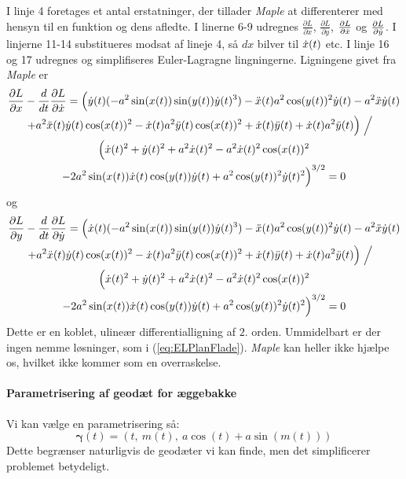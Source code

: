 I linje 4 foretages et antal erstatninger,
der tillader \emph{Maple} at differenterer med hensyn til en funktion og dens afledte.
I linerne 6-9 udregnes \(\frac{\partial L}{\partial x}\), \(\frac{\partial L}{\partial y}\),
 \(\frac{\partial L}{\partial \dot{x}}\) og \(\frac{\partial L}{\partial \dot{y}}\).
I linjerne 11-14 substitueres modsat af lineje 4, så \(dx\) bilver til \(\dot{x}(t)\) etc.
I linje 16 og 17 udregnes og simplifiseres Euler-Lagragne lingningerne.
Ligningene givet fra \emph{Maple} er
\begin{multline*}
\frac{\partial L}{\partial x} - \frac{d}{d t} \frac{\partial L}{\partial \dot{x}} = 
\Big(
\dot{y}(t)(-a^2\sin(x(t))\sin(y(t))\dot{y}(t)^3)
- \ddot{x}(t) a^2 \cos(y(t))^2 \dot{y}(t) - a^2\ddot{x}\dot{y}(t)\\
+ a^2\ddot{x}(t)\dot{y}(t)\cos(x(t))^2 - \dot{x}(t)a^2\ddot{y}(t)\cos(x(t))^2
+ \dot{x}(t) \ddot{y}(t) + \dot{x}(t)a^2\ddot{y}(t)
\Big) \left. \middle/ \phantom{\Big(} \right.\\
\Big( \dot{x}(t)^2 + \dot{y}(t)^2 + a^2\dot{x}(t)^2 - a^2\dot{x}(t)^2\cos(x(t))^2\\
 - 2a^2\sin(x(t))\dot{x}(t)\cos(y(t))\dot{y}(t) + a^2 \cos(y(t))^2\dot{y}(t)^2 \Big)^{3/2} = 0
\end{multline*}
og
\begin{multline*}
\frac{\partial L}{\partial y} - \frac{d}{d t} \frac{\partial L}{\partial \dot{y}} = 
\Big(
\dot{x}(t)(-a^2\sin(x(t))\sin(y(t))\dot{y}(t)^3)
- \ddot{x}(t) a^2 \cos(y(t))^2 \dot{y}(t) - a^2\ddot{x}\dot{y}(t)\\
+ a^2\ddot{x}(t)\dot{y}(t)\cos(x(t))^2 - \dot{x}(t)a^2\ddot{y}(t)\cos(x(t))^2
+ \dot{x}(t) \ddot{y}(t) + \dot{x}(t)a^2\ddot{y}(t)
\Big) \left. \middle/ \phantom{\Big(} \right.\\
\Big( \dot{x}(t)^2 + \dot{y}(t)^2 + a^2\dot{x}(t)^2 - a^2\dot{x}(t)^2\cos(x(t))^2\\
 - 2a^2\sin(x(t))\dot{x}(t)\cos(y(t))\dot{y}(t) + a^2 \cos(y(t))^2\dot{y}(t)^2 \Big)^{3/2} = 0
\end{multline*}
Dette er en koblet, ulineær differentialligning af \(2.\) orden.
Ummidelbart er der ingen nemme løsninger, som i (\ref{eq:ELPlanFlade}).
\emph{Maple} kan heller ikke hjælpe os, hvilket ikke kommer som en overraskelse.

\paragraph{Parametrisering af geodæt for æggebakke}
Vi kan vælge en parametrisering så:
\begin{equation}\label{eq:aeggegeonem}
\pmb{\gamma}(t) = ( t ,~m(t),~a\cos(t) + a\sin(m(t)))
\end{equation}
Dette begrænser naturligvis de geodæter vi kan finde, men det simplificerer problemet betydeligt.

